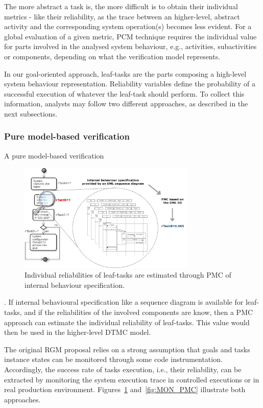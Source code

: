 The more abstract a task is, the more difficult is to 
obtain their individual metrics - like their reliability, as the trace between an higher-level, abstract activity and the corresponding system operation(s) becomes less evident. For a global evaluation of a given metric, PCM technique requires the individual value for parts involved in the analysed system behaviour, e.g., activities, subactivities or components, depending on what the verification model represents.

In our goal-oriented approach, leaf-tasks are the parts composing a high-level system behaviour representation. Reliability variables define the probability of a successful execution of whatever the leaf-task should perform. To collect this information, analysts may follow two different approaches, as described in the next subsections. 

\subsubsection{Pure model-based verification}

A pure model-based verification 

\begin{figure}[ht!]
\centering
\includegraphics[width=0.75\textwidth]{imgs/MD_PMC.png}
\caption{Individual reliabilities of leaf-tasks are estimated through PMC of internal behaviour specification.}
\label{fig:MD_PMC}
\end{figure}


. If internal behavioural specification like a sequence diagram is available for leaf-tasks, and if the reliabilities of the involved components are know, then a PMC approach can estimate the individual reliability of leaf-tasks. This value would then be used in the higher-level DTMC model. 

The original RGM proposal relies on a strong assumption that goals and tasks instance states can be monitored through some code instrumentation. Accordingly, the success rate of tasks execution, i.e., their reliability, can be extracted by monitoring the system execution trace in controlled executions or in real production environment. Figures~\ref{fig:MD_PMC} and~\ref{fig:MON_PMC} illustrate both approaches.


